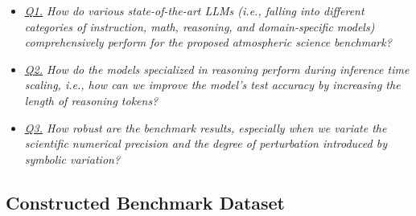 \begin{itemize}[topsep=5pt, leftmargin=1em]
\vspace{-0.5em}
\item \textit{\underline{Q1.} How do various state-of-the-art LLMs (i.e., falling into different categories of instruction, math, reasoning, and domain-specific models) comprehensively perform for the proposed atmospheric science benchmark?}

\vspace{-0.35em}
\item \textit{\underline{Q2.} How do the models specialized in reasoning perform during inference time scaling, i.e., how can we improve the model's test accuracy by increasing the length of reasoning tokens?}


\vspace{-0.35em}
\item \textit{\underline{Q3.} How robust are the benchmark results, especially when we variate the scientific numerical precision and the degree of perturbation introduced by symbolic variation?}

\vspace{-0.5em}
\end{itemize}

















\subsection{Constructed Benchmark Dataset}


